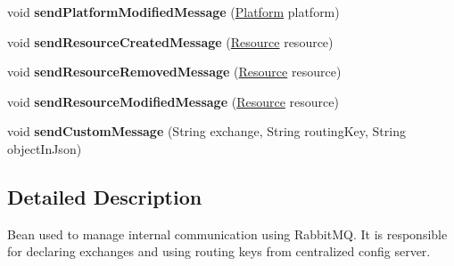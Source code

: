 \begin{DoxyCompactItemize}
\item 
void {\bfseries send\+Platform\+Modified\+Message} (\hyperlink{classeu_1_1h2020_1_1symbiote_1_1model_1_1Platform}{Platform} platform)\hypertarget{classeu_1_1h2020_1_1symbiote_1_1messaging_1_1RabbitManager_ac241cd7e1ec4b33aa0a907b86eecb354}{}\label{classeu_1_1h2020_1_1symbiote_1_1messaging_1_1RabbitManager_ac241cd7e1ec4b33aa0a907b86eecb354}

\item 
void {\bfseries send\+Resource\+Created\+Message} (\hyperlink{classeu_1_1h2020_1_1symbiote_1_1model_1_1Resource}{Resource} resource)\hypertarget{classeu_1_1h2020_1_1symbiote_1_1messaging_1_1RabbitManager_a1499d1a2def21a1c2a405b1448918da7}{}\label{classeu_1_1h2020_1_1symbiote_1_1messaging_1_1RabbitManager_a1499d1a2def21a1c2a405b1448918da7}

\item 
void {\bfseries send\+Resource\+Removed\+Message} (\hyperlink{classeu_1_1h2020_1_1symbiote_1_1model_1_1Resource}{Resource} resource)\hypertarget{classeu_1_1h2020_1_1symbiote_1_1messaging_1_1RabbitManager_aa77dd12749ba669407cdd928eb7138b6}{}\label{classeu_1_1h2020_1_1symbiote_1_1messaging_1_1RabbitManager_aa77dd12749ba669407cdd928eb7138b6}

\item 
void {\bfseries send\+Resource\+Modified\+Message} (\hyperlink{classeu_1_1h2020_1_1symbiote_1_1model_1_1Resource}{Resource} resource)\hypertarget{classeu_1_1h2020_1_1symbiote_1_1messaging_1_1RabbitManager_a05e443fe0be56a424239727cfed231da}{}\label{classeu_1_1h2020_1_1symbiote_1_1messaging_1_1RabbitManager_a05e443fe0be56a424239727cfed231da}

\item 
void {\bfseries send\+Custom\+Message} (String exchange, String routing\+Key, String object\+In\+Json)\hypertarget{classeu_1_1h2020_1_1symbiote_1_1messaging_1_1RabbitManager_a39ec3510289f5e647eb4dab95f82e127}{}\label{classeu_1_1h2020_1_1symbiote_1_1messaging_1_1RabbitManager_a39ec3510289f5e647eb4dab95f82e127}

\end{DoxyCompactItemize}


\subsection{Detailed Description}
Bean used to manage internal communication using Rabbit\+MQ. It is responsible for declaring exchanges and using routing keys from centralized config server. 

